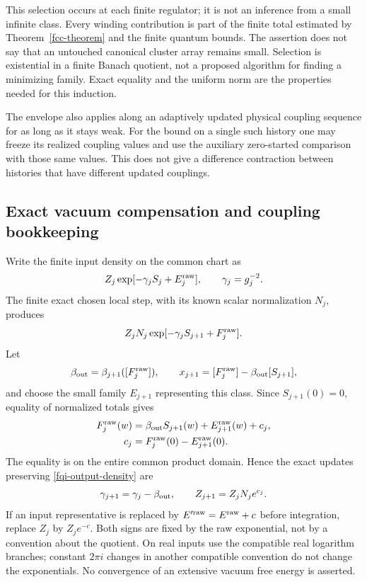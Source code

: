 This selection occurs at each finite regulator; it is not
an inference from a small infinite class. Every winding
contribution is part of the finite total estimated by
Theorem~\ref{fcc-theorem} and the finite quantum bounds.
The assertion does not say that an untouched canonical
cluster array remains small. Selection is existential in
a finite Banach quotient, not a proposed algorithm for
finding a minimizing family. Exact equality and the uniform
norm are the properties needed for this induction.

The envelope also applies along an adaptively updated physical
coupling sequence for as long as it stays weak. For the bound
on a single such history one may freeze its realized coupling
values and use the auxiliary zero-started comparison with those
same values. This does not give a difference contraction
between histories that have different updated couplings.

\subsection{Exact vacuum compensation and coupling bookkeeping}
\label{fqi-vacuum-section}

Write the finite input density on the common chart as
\begin{equation}
 Z_j\exp[-\gamma_jS_j+E_j^{\rm raw}],\qquad
 \gamma_j=g_j^{-2}.
 \label{fqi-input-density}
\end{equation}
The finite exact chosen local step, with its known scalar
normalization $N_j$, produces
\begin{equation}
 Z_jN_j\exp[-\gamma_jS_{j+1}+F_j^{\rm raw}].
 \label{fqi-output-density}
\end{equation}
Let
\[
 \beta_{\rm out}=\beta_{j+1}([F_j^{\rm raw}]),\qquad
 x_{j+1}=[F_j^{\rm raw}]-\beta_{\rm out}[S_{j+1}],
\]
and choose the small family $E_{j+1}$ representing this class.
Since $S_{j+1}(0)=0$, equality of normalized totals gives
\begin{align}
 F_j^{\rm raw}(w)
   &=\beta_{\rm out}S_{j+1}(w)
                       +E_{j+1}^{\rm raw}(w)+c_j,\notag\\
 c_j&=F_j^{\rm raw}(0)-E_{j+1}^{\rm raw}(0).
 \label{fqi-constant-compensation}
\end{align}
The equality is on the entire common product domain. Hence
the exact updates preserving \eqref{fqi-output-density} are
\begin{equation}
 \gamma_{j+1}=\gamma_j-\beta_{\rm out},\qquad
 Z_{j+1}=Z_jN_j e^{c_j}.
 \label{fqi-vacuum-update}
\end{equation}
If an input representative is replaced by
$E'^{\rm raw}=E^{\rm raw}+c$ before integration, replace
$Z_j$ by $Z_je^{-c}$. Both signs are fixed by the raw
exponential, not by a convention about the quotient.
On real inputs use the compatible real logarithm branches;
constant $2\pi i$ changes in another compatible convention
do not change the exponentials. No convergence of an extensive
vacuum free energy is asserted.

